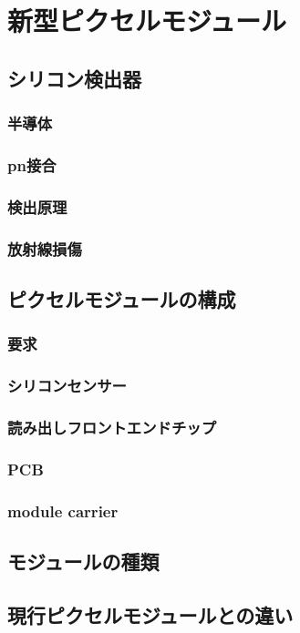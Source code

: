 \chapter{新型ピクセルモジュール}

\section{シリコン検出器}
\subsection{半導体}
\subsection{pn接合}
\subsection{検出原理}
\subsection{放射線損傷}

\section{ピクセルモジュールの構成}
\subsection{要求}
\subsection{シリコンセンサー}
\subsection{読み出しフロントエンドチップ}
\subsection{PCB}
\subsection{module carrier}

\section{モジュールの種類}

\section{現行ピクセルモジュールとの違い}
